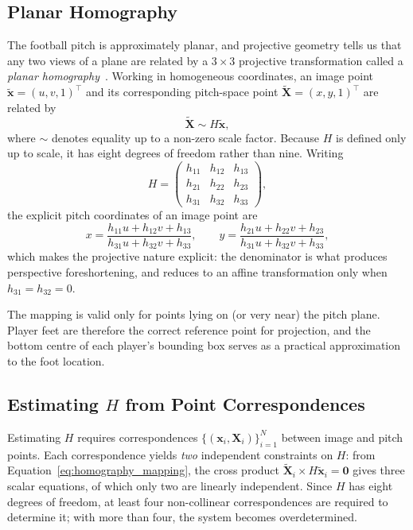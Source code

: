 \subsection{Planar Homography}
\label{subsec:background_homography_estimation}

The football pitch is approximately planar, and projective 
geometry tells us that any two views of a plane are related 
by a \(3 \times 3\) projective transformation called a 
\emph{planar homography}~\cite{hartley2003multiple}. 
Working in homogeneous coordinates, an image point 
\(\tilde{\mathbf{x}} = (u, v, 1)^\top\) and its 
corresponding pitch-space point 
\(\tilde{\mathbf{X}} = (x, y, 1)^\top\) are related by
\begin{equation}
    \tilde{\mathbf{X}} \sim H\tilde{\mathbf{x}},
    \label{eq:homography_mapping}
\end{equation}
where \(\sim\) denotes equality up to a non-zero scale 
factor. Because \(H\) is defined only up to scale, it has 
eight degrees of freedom rather than nine. Writing
\[
    H =
    \begin{pmatrix}
        h_{11} & h_{12} & h_{13} \\
        h_{21} & h_{22} & h_{23} \\
        h_{31} & h_{32} & h_{33}
    \end{pmatrix},
\]
the explicit pitch coordinates of an image point are
\begin{equation}
    x = \frac{h_{11}u + h_{12}v + h_{13}}{h_{31}u + h_{32}v + h_{33}},
    \qquad
    y = \frac{h_{21}u + h_{22}v + h_{23}}{h_{31}u + h_{32}v + h_{33}},
    \label{eq:homography_dehomogenised}
\end{equation}
which makes the projective nature explicit: the 
denominator is what produces perspective foreshortening, 
and reduces to an affine transformation only when 
\(h_{31} = h_{32} = 0\).

The mapping is valid only for points lying on (or very 
near) the pitch plane. Player feet are therefore the 
correct reference point for projection, and the bottom 
centre of each player's bounding box serves as a practical 
approximation to the foot location.

\subsection{Estimating $H$ from Point Correspondences}
\label{subsec:background_dlt}

Estimating \(H\) requires correspondences 
\(\{(\mathbf{x}_i, \mathbf{X}_i)\}_{i=1}^{N}\) between 
image and pitch points. Each correspondence yields 
\emph{two} independent constraints on \(H\): from 
Equation~\ref{eq:homography_mapping}, the cross product 
\(\tilde{\mathbf{X}}_i \times H\tilde{\mathbf{x}}_i = 
\mathbf{0}\) gives three scalar equations, of which only 
two are linearly independent. Since \(H\) has eight 
degrees of freedom, at least four non-collinear 
correspondences are required to determine it; with more 
than four, the system becomes overdetermined.


